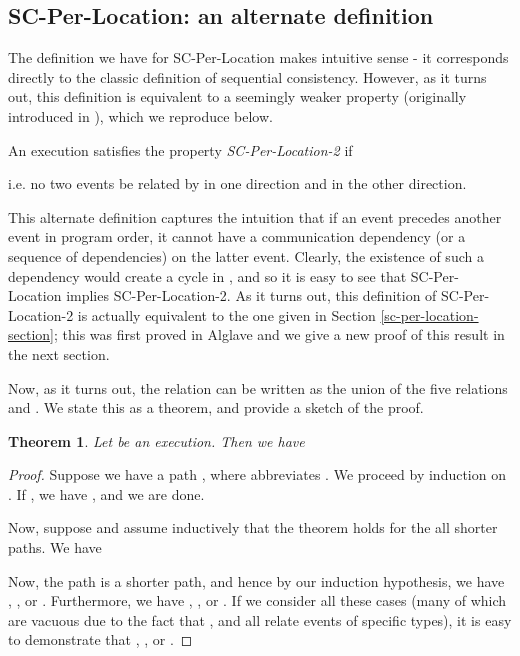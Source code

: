 \documentclass[]{eptcs}
\newtheorem{theorem}{Theorem}[section]
\newenvironment{definition}[1][Definition.]{\begin{trivlist}
\item[\hskip \labelsep {\bfseries #1}]}{\end{trivlist}}
\begin{document}
\subsection{SC-Per-Location: an alternate definition}

The definition we have for SC-Per-Location makes intuitive sense - it corresponds directly to the classic definition of sequential consistency. However, as it turns out, this definition is equivalent to a seemingly weaker property (originally introduced in \cite{alglave_thesis}), which we reproduce below. 

\begin{definition}
An execution  satisfies the property \emph{SC-Per-Location-2} if 

i.e. no two events be related by  in one direction and  in the other direction.
\end{definition}

This alternate definition captures the intuition that if an event precedes another event in program order, it cannot have a communication dependency (or a sequence of dependencies) on the latter event. Clearly, the existence of such a dependency would create a cycle in , and so it is easy to see that SC-Per-Location implies SC-Per-Location-2. As it turns out, this definition of SC-Per-Location-2 is actually equivalent to the one given in Section \ref{sc-per-location-section}; this was first proved in Alglave \cite{alglave_thesis} and we give a new proof of this result in the next section.

Now, as it turns out, the  relation can be written as the union of the five relations  and . We state this as a theorem, and provide a sketch of the proof.

\begin{theorem}\label{rewrite_com+}
Let  be an execution. Then we have

\end{theorem}
\begin{proof}
Suppose we have a path , where  abbreviates . We proceed by induction on . If , we have , and we are done.

Now, suppose  and assume inductively that the theorem holds for the all shorter paths. We have

Now, the path  is a shorter path, and hence by our induction hypothesis, we have , , or . Furthermore, we have , , or . If we consider all these cases (many of which are vacuous due to the fact that ,  and  all relate events of specific types), it is easy to demonstrate that , , or .
\end{proof}
\end{document}

